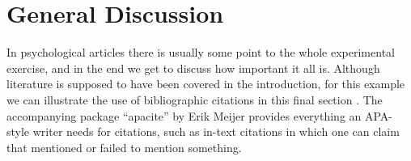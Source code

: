 \documentclass[man]{apa}
\begin{document}
\section{General Discussion}
In psychological articles there is usually some point to the whole experimental exercise, and in the end we get to discuss how important it all is.  Although literature is supposed to have been covered in the introduction, for this example we can illustrate the use of bibliographic citations in this final section \cite{art1}. The accompanying package ``apacite'' by Erik Meijer provides everything an APA-style writer needs for citations, such as in-text citations in which one can claim that  mentioned or failed to mention something.


\end{document}
